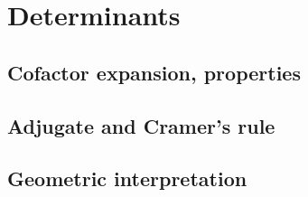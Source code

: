 
\section{Determinants}

\subsection{Cofactor expansion, properties}


\subsection{Adjugate and Cramer's rule}


\subsection{Geometric interpretation}

